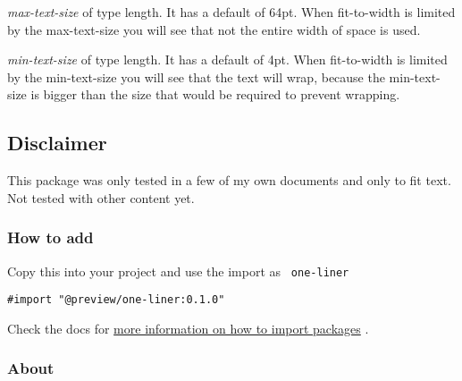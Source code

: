 \emph{max-text-size} of type length. It has a default of 64pt. When
fit-to-width is limited by the max-text-size you will see that not the
entire width of space is used.

\emph{min-text-size} of type length. It has a default of 4pt. When
fit-to-width is limited by the min-text-size you will see that the text
will wrap, because the min-text-size is bigger than the size that would
be required to prevent wrapping.

\subsection{Disclaimer}\label{disclaimer}

This package was only tested in a few of my own documents and only to
fit text. Not tested with other content yet.

\subsubsection{How to add}\label{how-to-add}

Copy this into your project and use the import as \texttt{\ one-liner\ }

\begin{verbatim}
#import "@preview/one-liner:0.1.0"
\end{verbatim}



Check the docs for
\href{https://typst.app/docs/reference/scripting/\#packages}{more
information on how to import packages} .

\subsubsection{About}\label{about}

